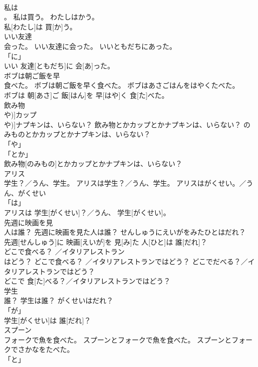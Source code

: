 \documentclass[8pt]{extreport}
\begin{document}
\begin{CJK}{UTF8}{min}
\\	私は
\\	。	私は買う。	わたしはかう。	
\\	私[わたし]は 買[か]う。		
\\	いい友達
\\	会った。	いい友達に会った。	いいともだちにあった。	
\\	「に」 
\\	いい 友達[ともだち]に 会[あ]った。		
\\	ボブは朝ご飯を早
\\	食べた。	ボブは朝ご飯を早く食べた。	ボブはあさごはんをはやくたべた。	
\\	ボブは 朝[あさ]ご 飯[はん]を 早[はや]く 食[た]べた。		
\\	飲み物
\\	や)]カップ
\\	や)]ナプキンは、いらない？	飲み物とかカップとかナプキンは、いらない？	のみものとかカップとかナプキンは、いらない？	
\\	「や」 
\\	「とか」 
\\	飲み物[のみもの]とかカップとかナプキンは、いらない？		
\\	アリス
\\	学生？／うん、学生。	アリスは学生？／うん、学生。	アリスはがくせい。／うん、がくせい	
\\	「は」 
\\	アリスは 学生[がくせい]？／うん、 学生[がくせい]。		
\\	先週に映画を見
\\	人は誰？	先週に映画を見た人は誰？	せんしゅうにえいがをみたひとはだれ？	
\\	先週[せんしゅう]に 映画[えいが]を 見[み]た 人[ひと]は 誰[だれ]？		
\\	どこで食べる？ ／イタリアレストラン
\\	はどう？	どこで食べる？ ／イタリアレストランではどう？	どこでだべる？／イタリアレストランではどう？	
\\	どこで 食[た]べる？／イタリアレストランではどう？		
\\	学生
\\	誰？	学生は誰？	がくせいはだれ？	
\\	「が」 
\\	学生[がくせい]は 誰[だれ]？		
\\	スプーン
\\	フォークで魚を食べた。	スプーンとフォークで魚を食べた。	スプーンとフォークでさかなをたべた。	
\\	「と」 

\end{CJK}
\end{document}
